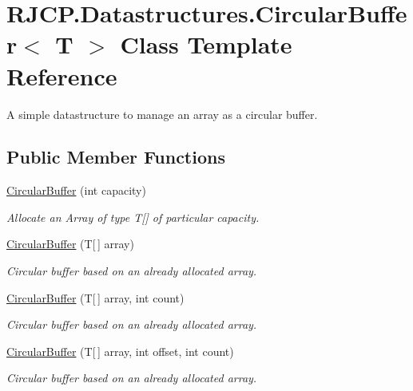 \hypertarget{class_r_j_c_p_1_1_datastructures_1_1_circular_buffer}{}\section{R\+J\+C\+P.\+Datastructures.\+Circular\+Buffer$<$ T $>$ Class Template Reference}
\label{class_r_j_c_p_1_1_datastructures_1_1_circular_buffer}


A simple datastructure to manage an array as a circular buffer.  


\subsection*{Public Member Functions}
\begin{DoxyCompactItemize}
\item 
\mbox{\hyperlink{class_r_j_c_p_1_1_datastructures_1_1_circular_buffer_af18decda3e642fce4e140de2375e67d4}{Circular\+Buffer}} (int capacity)
\begin{DoxyCompactList}\small\item\em Allocate an Array of type T\mbox{[}\mbox{]} of particular capacity. \end{DoxyCompactList}\item 
\mbox{\hyperlink{class_r_j_c_p_1_1_datastructures_1_1_circular_buffer_af815d2e44d5045fa4fdea13bd1591ab5}{Circular\+Buffer}} (T\mbox{[}$\,$\mbox{]} array)
\begin{DoxyCompactList}\small\item\em Circular buffer based on an already allocated array. \end{DoxyCompactList}\item 
\mbox{\hyperlink{class_r_j_c_p_1_1_datastructures_1_1_circular_buffer_af7bb9c18806f30e833956805824fe59a}{Circular\+Buffer}} (T\mbox{[}$\,$\mbox{]} array, int count)
\begin{DoxyCompactList}\small\item\em Circular buffer based on an already allocated array. \end{DoxyCompactList}\item 
\mbox{\hyperlink{class_r_j_c_p_1_1_datastructures_1_1_circular_buffer_a48d3cf3ad804cd6b22e921de5f93dc12}{Circular\+Buffer}} (T\mbox{[}$\,$\mbox{]} array, int offset, int count)
\begin{DoxyCompactList}\small\item\em Circular buffer based on an already allocated array. \end{DoxyCompactList}\item 

\end{DoxyCompactItemize}
